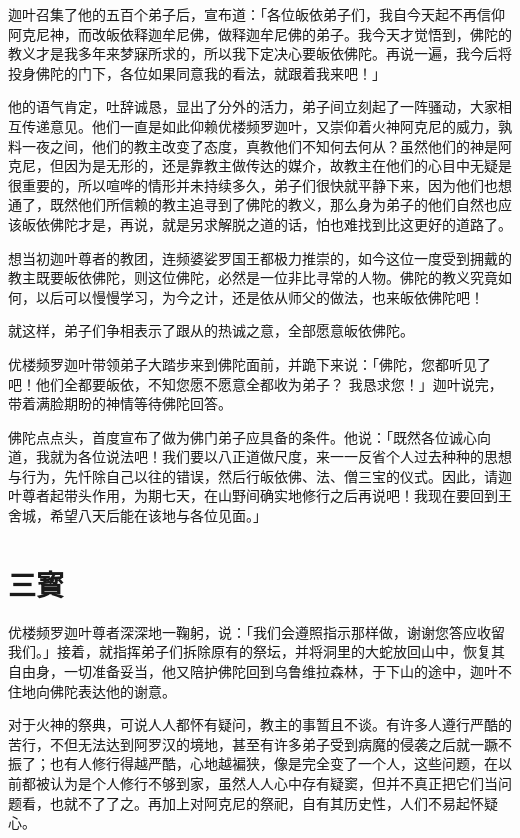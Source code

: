 \documentclass[12pt,twoside,openany]{book}
\begin{document}
迦叶召集了他的五百个弟子后，宣布道：「各位皈依弟子们，我自今天起不再信仰阿克尼神，而改皈依释迦牟尼佛，做释迦牟尼佛的弟子。我今天才觉悟到，佛陀的教义才是我多年来梦寐所求的，所以我下定决心要皈依佛陀。再说一遍，我今后将投身佛陀的门下，各位如果同意我的看法，就跟着我来吧！」

他的语气肯定，吐辞诚恳，显出了分外的活力，弟子间立刻起了一阵骚动，大家相互传递意见。他们一直是如此仰赖优楼频罗迦叶，又崇仰着火神阿克尼的威力，孰料一夜之间，他们的教主改变了态度，真教他们不知何去何从？虽然他们的神是阿克尼，但因为是无形的，还是靠教主做传达的媒介，故教主在他们的心目中无疑是很重要的，所以喧哗的情形并未持续多久，弟子们很快就平静下来，因为他们也想通了，既然他们所信赖的教主追寻到了佛陀的教义，那么身为弟子的他们自然也应该皈依佛陀才是，再说，就是另求解脱之道的话，怕也难找到比这更好的道路了。

想当初迦叶尊者的教团，连频婆娑罗国王都极力推崇的，如今这位一度受到拥戴的教主既要皈依佛陀，则这位佛陀，必然是一位非比寻常的人物。佛陀的教义究竟如何，以后可以慢慢学习，为今之计，还是依从师父的做法，也来皈依佛陀吧！

就这样，弟子们争相表示了跟从的热诚之意，全部愿意皈依佛陀。

优楼频罗迦叶带领弟子大踏步来到佛陀面前，并跪下来说：「佛陀，您都听见了吧！他们全都要皈依，不知您愿不愿意全都收为弟子？	我恳求您！」迦叶说完，带着满脸期盼的神情等待佛陀回答。

佛陀点点头，首度宣布了做为佛门弟子应具备的条件。他说：「既然各位诚心向道，我就为各位说法吧！我们要以八正道做尺度，来一一反省个人过去种种的思想与行为，先忏除自己以往的错误，然后行皈依佛、法、僧三宝的仪式。因此，请迦叶尊者起带头作用，为期七天，在山野间确实地修行之后再说吧！我现在要回到王舍城，希望八天后能在该地与各位见面。」

\section{三寳}\label{sec3.6}

优楼频罗迦叶尊者深深地一鞠躬，说：「我们会遵照指示那样做，谢谢您答应收留我们。」接着，就指挥弟子们拆除原有的祭坛，并将洞里的大蛇放回山中，恢复其自由身，一切准备妥当，他又陪护佛陀回到乌鲁维拉森林，于下山的途中，迦叶不住地向佛陀表达他的谢意。

对于火神的祭典，可说人人都怀有疑问，教主的事暂且不谈。有许多人遵行严酷的苦行，不但无法达到阿罗汉的境地，甚至有许多弟子受到病魔的侵袭之后就一蹶不振了；也有人修行得越严酷，心地越褊狭，像是完全变了一个人，这些问题，在以前都被认为是个人修行不够到家，虽然人人心中存有疑窦，但并不真正把它们当问题看，也就不了了之。再加上对阿克尼的祭祀，自有其历史性，人们不易起怀疑心。
\end{document}
